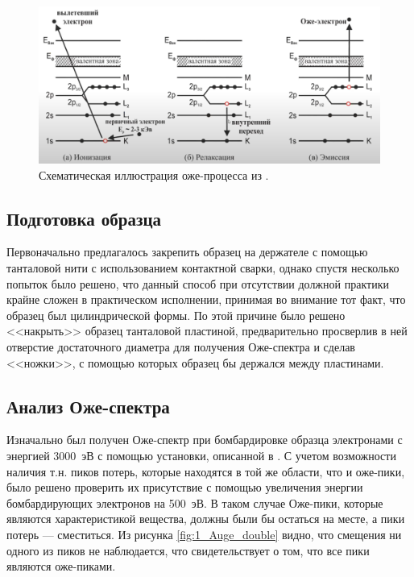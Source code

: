 \documentclass[a4paper, 12pt]{article}
\begin{document}
	\begin{figure}[H]
		\centering
		\includegraphics[width=0.7\linewidth]{1_diag}
		\caption{Схематическая иллюстрация оже-процесса из \cite{Auge_diag}.}
		\label{fig:1_diag}
	\end{figure}
	
	\subsection{Подготовка образца}
	
	Первоначально предлагалось закрепить образец на держателе с помощью танталовой нити с использованием контактной сварки, однако спустя несколько попыток было решено, что данный способ при отсутствии должной практики крайне сложен в практическом исполнении, принимая во внимание тот факт, что образец был цилиндрической формы. По этой причине было решено <<накрыть>> образец танталовой пластиной, предварительно просверлив в ней отверстие достаточного диаметра для получения Оже-спектра и сделав <<ножки>>, с помощью которых образец бы держался между пластинами.
	
	
	\subsection{Анализ Оже-спектра}
	
	Изначально был получен Оже-спектр при бомбардировке образца электронами с энергией 3000~эВ с помощью установки, описанной в \cite{Auger_spectr}. С учетом возможности наличия т.н. пиков потерь, которые находятся в той же области, что и оже-пики, было решено проверить их присутствие с помощью увеличения энергии бомбардирующих электронов на 500~эВ. В таком случае Оже-пики, которые являются характеристикой вещества, должны были бы остаться на месте, а пики потерь --- сместиться. Из рисунка \ref{fig:1_Auge_double} видно, что смещения ни одного из пиков не наблюдается, что свидетельствует о том, что все пики являются оже-пиками.
	
\end{document}
